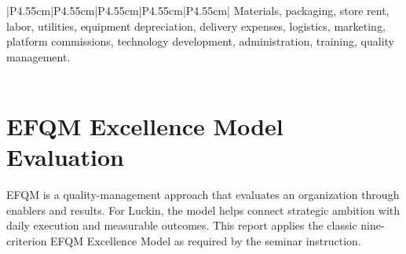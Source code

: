 \documentclass[12pt,a4paper]{article}
\begin{document}
\begin{landscape}
\begin{table}[H]
\begin{tabular}{|P{4.55cm}|P{4.55cm}|P{4.55cm}|P{4.55cm}|P{4.55cm}|}
{Materials, packaging, store rent, labor, utilities, equipment depreciation, delivery expenses, logistics, marketing, platform commissions, technology development, administration, training, quality management.} \\
\hline
{} \\
\hline
\end{tabular}
\end{table}
\end{landscape}
\clearpage

\section{EFQM Excellence Model Evaluation}

EFQM is a quality-management approach that evaluates an organization through enablers and results. For Luckin, the model helps connect strategic ambition with daily execution and measurable outcomes. This report applies the classic nine-criterion EFQM Excellence Model as required by the seminar instruction.
\end{document}
